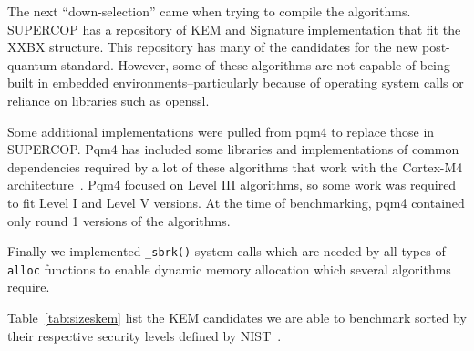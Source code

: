 \documentclass[10pt]{article}
\begin{document}
The next ``down-selection'' came when trying to compile the algorithms. 
SUPERCOP has a repository of KEM and Signature implementation that fit the XXBX structure. 
This repository has many of the candidates for the new post-quantum standard. 
However, some of these algorithms are not capable of being built in embedded 
environments--particularly because of operating system calls or reliance on 
libraries such as openssl.

Some additional implementations were pulled from pqm4 to replace those in SUPERCOP. 
Pqm4 has included some libraries and implementations of common dependencies required by 
a lot of these algorithms that work with the Cortex-M4 architecture~\cite{PQM4}. Pqm4 focused on 
Level III algorithms, so some work was required to fit Level I and Level V versions. 
At the time of benchmarking, pqm4 contained only round 1 versions of the algorithms.


Finally we implemented \texttt{\_sbrk()} system calls which are needed by all 
types of \texttt{alloc} functions to enable dynamic memory allocation which several 
algorithms require.

Table~\ref{tab:sizeskem} list the KEM candidates we are able to benchmark sorted by 
their respective security levels defined by NIST~\cite{pqccfp}.  
\end{document}
